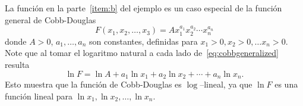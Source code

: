 La función en la parte~\eqref{item:b} del ejemplo  es un caso especial de la función general de Cobb-Douglas
\begin{equation}\label{eq:cobbgeneralized}
F\left(x_{1},x_{2},\ldots,x_{3}\right)=A{x}^{a_{1}}_{1}{x}^{a_{2}}_{2}\cdots{x}^{a_{n}}_{n}
\end{equation}
donde $A>0$, $a_{1},\ldots,a_{n}$ son constantes, definidas para $x_{1}>0,x_{2}>0,\ldots x_{n}>0$. Note que al tomar el logaritmo natural a cada lado de~\eqref{eq:cobbgeneralized} resulta
\begin{equation}
\ln F=\ln A+a_{1}\ln x_{1}+a_{2}\ln x_{2}+\cdots+a_{n}\ln x_{n}.
\end{equation}
Esto muestra que la función de Cobb-Douglas es $\log$--lineal, ya que $\ln F$ es una función lineal para $\ln x_{1},\ln x_{2},\ldots,\ln x_{n}$.